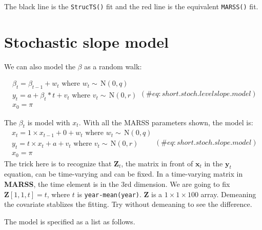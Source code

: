 \documentclass[12pt,]{book}
\begin{document}
The black line is the \texttt{StrucTS()} fit and the red line is the equivalent \texttt{MARSS()} fit.

\hypertarget{stochastic-slope-model}{%
\section{Stochastic slope model}\label{stochastic-slope-model}}

We can also model the \(\beta\) as a random walk:

\begin{equation}
\begin{gathered}
\beta_t = \beta_{t-1}+w_t \text{ where } w_t \sim \,\text{N}(0,q) \\
y_t = a + \beta_t*t + v_t \text{ where } v_t \sim \,\text{N}(0,r)  \\
x_0 = \pi 
\end{gathered}   
(\#eq:short.stoch.levelslope.model)
\end{equation}

The \(\beta_t\) is model with \(x_t\). With all the MARSS parameters shown, the model is:
\begin{equation}
\begin{gathered}
x_t = 1 \times x_{t-1}+ 0 + w_t    \text{ where } w_t \sim \,\text{N}(0,q) \\
y_t = t \times x_t + a + v_t \text{ where } v_t \sim \,\text{N}(0,r)  \\
x_0 = \pi 
 \end{gathered}   
(\#eq:short.stoch.slope.model)
\end{equation}
The trick here is to recognize that \(\mathbf{Z}_t\), the matrix in front of \(\mathbf{x}_t\) in the \(\mathbf{y}_t\) equation, can be time-varying and can be fixed. In a time-varying matrix in \textbf{MARSS}, the time element is in the 3rd dimension. We are going to fix \(\mathbf{Z}[1,1,t] = t\), where \(t\) is \texttt{year-mean(year)}. \(\mathbf{Z}\) is a \(1 \times 1 \times 100\) array. Demeaning the covariate stablizes the fitting. Try without demeaning to see the difference.

The model is specified as a list as follows.
\end{document}
